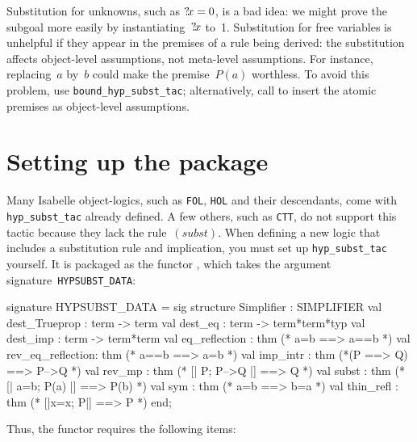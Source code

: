 Substitution for unknowns, such as ${?\!x}=0$, is a bad idea: we might prove
the subgoal more easily by instantiating~${?\!x}$ to~1.
Substitution for free variables is unhelpful if they appear in the
premises of a rule being derived: the substitution affects object-level
assumptions, not meta-level assumptions.  For instance, replacing~$a$
by~$b$ could make the premise~$P(a)$ worthless.  To avoid this problem, use
\texttt{bound_hyp_subst_tac}; alternatively, call  to
insert the atomic premises as object-level assumptions.


\section{Setting up the package} 
Many Isabelle object-logics, such as \texttt{FOL}, \texttt{HOL} and their
descendants, come with \texttt{hyp_subst_tac} already defined.  A few others,
such as \texttt{CTT}, do not support this tactic because they lack the
rule~$(subst)$.  When defining a new logic that includes a substitution
rule and implication, you must set up \texttt{hyp_subst_tac} yourself.  It
is packaged as the \ML{} functor , which takes the
argument signature~\texttt{HYPSUBST_DATA}:
\begin{ttbox} 
signature HYPSUBST_DATA =
  sig
  structure Simplifier : SIMPLIFIER
  val dest_Trueprop    : term -> term
  val dest_eq          : term -> term*term*typ
  val dest_imp         : term -> term*term
  val eq_reflection    : thm         (* a=b ==> a==b *)
  val rev_eq_reflection: thm         (* a==b ==> a=b *)
  val imp_intr         : thm         (*(P ==> Q) ==> P-->Q *)
  val rev_mp           : thm         (* [| P;  P-->Q |] ==> Q *)
  val subst            : thm         (* [| a=b;  P(a) |] ==> P(b) *)
  val sym              : thm         (* a=b ==> b=a *)
  val thin_refl        : thm         (* [|x=x; P|] ==> P *)
  end;
\end{ttbox}
Thus, the functor requires the following items:
